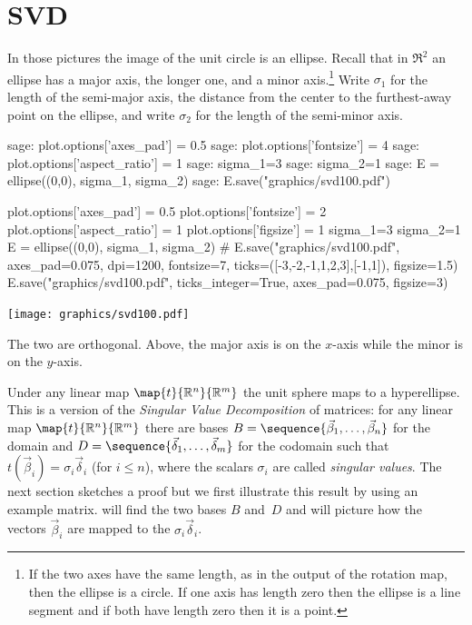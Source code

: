 \section{SVD}
In those pictures the image of the unit circle is an ellipse.
Recall that in $\Re^2$ an ellipse has a major axis, 
the longer one, and a minor axis.\footnote{%
  If the two axes have the same length,
  as in the output of the rotation map, 
  then the ellipse is a circle.
  If one axis has length zero then the ellipse is a line segment 
  and if both have length zero then it is a point.}
Write $\sigma_1$ for the length of the semi-major axis, 
the distance from the center to the furthest-away point on the ellipse,
and write $\sigma_2$ for the length of the semi-minor axis.
\begin{sagecommandline}
sage: plot.options['axes_pad'] = 0.5
sage: plot.options['fontsize'] = 4
sage: plot.options['aspect_ratio'] = 1
sage: sigma_1=3
sage: sigma_2=1
sage: E = ellipse((0,0), sigma_1, sigma_2)
sage: E.save("graphics/svd100.pdf")
\end{sagecommandline}
\begin{sagesilent}
plot.options['axes_pad'] = 0.5
plot.options['fontsize'] = 2
plot.options['aspect_ratio'] = 1
plot.options['figsize'] = 1
sigma_1=3
sigma_2=1
E = ellipse((0,0), sigma_1, sigma_2)
# E.save("graphics/svd100.pdf", axes_pad=0.075, dpi=1200, fontsize=7, ticks=([-3,-2,-1,1,2,3],[-1,1]), figsize=1.5)
E.save("graphics/svd100.pdf", ticks_integer=True, axes_pad=0.075, figsize=3)
\end{sagesilent}
\begin{center}
  \texttt{[image: graphics/svd100.pdf]}
\end{center}
The two are orthogonal.
Above, the major axis is on the $x$-axis while the
minor is on the $y$-axis.

Under any linear map $\map{t}{\Re^n}{\Re^m}$ the 
unit sphere maps to a hyperellipse.
This is a version of the \textit{Singular Value Decomposition} of
matrices:
for any linear map $\map{t}{\Re^n}{\Re^m}$ there are bases
$B=\sequence{\vec{\beta}_1,\ldots,\vec{\beta}_n}$ for the domain and
$D=\sequence{\vec{\delta}_1,\ldots,\vec{\delta}_m}$ for the codomain
such that $t(\vec{\beta}_i)=\sigma_i\vec{\delta}_i$ (for $i\leq n$), where the
scalars $\sigma_i$ are called \textit{singular values}.
The next section sketches a proof
but we first illustrate this result by using an example matrix.
\Sage{} will find the two bases $B$ and~$D$ and will picture how the 
vectors $\vec{\beta}_i$ 
are mapped to the $\sigma_i\vec{\delta}_i$.

